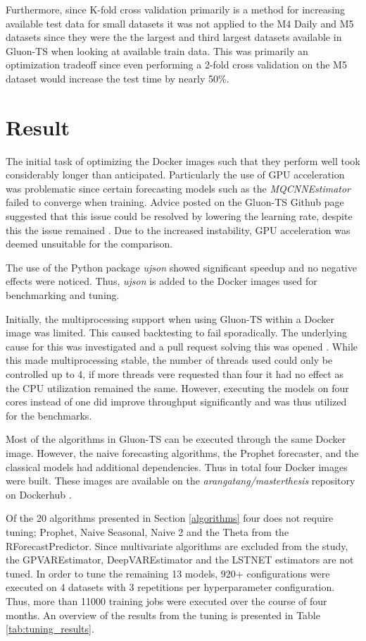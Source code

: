 Furthermore, since K-fold cross validation primarily is a method for increasing available test data for small datasets it was not applied to the M4 Daily and M5 datasets since they were the the largest and third largest datasets available in Gluon-TS when looking at available train data. This was primarily an optimization tradeoff since even performing a 2-fold cross validation on the M5 dataset would increase the test time by nearly 50\%.

\section{Result}
The initial task of optimizing the Docker images such that they perform well took considerably longer than anticipated. Particularly the use of GPU acceleration was problematic since certain forecasting models such as the \textit{MQCNNEstimator} failed to converge when training. Advice posted on the Gluon-TS Github page suggested that this issue could be resolved by lowering the learning rate, despite this the issue remained \cite{gluonts-github}. Due to the increased instability, GPU acceleration was deemed unsuitable for the comparison.

The use of the Python package \textit{ujson} showed significant speedup and no negative effects were noticed. Thus, \textit{ujson} is added to the Docker images used for benchmarking and tuning.

Initially, the multiprocessing support when using Gluon-TS within a Docker image was limited. This caused backtesting to fail sporadically. The underlying cause for this was investigated and a pull request solving this was opened \cite{fix_dockerfile_pr}. While this made multiprocessing stable, the number of threads used could only be controlled up to 4, if more threads vere requested than four it had no effect as the CPU utilization remained the same. However, executing the models on four cores instead of one did improve throughput significantly and was thus utilized for the benchmarks.

Most of the algorithms in Gluon-TS can be executed through the same Docker image. However, the naive forecasting algorithms, the Prophet forecaster, and the classical models had additional dependencies. Thus in total four Docker images were built. These images are available on the \textit{arangatang/masterthesis} repository on Dockerhub \cite{dockerhub_arangatang}.

Of the 20 algorithms presented in Section \ref{algorithms} four does not require tuning; Prophet, Naive Seasonal, Naive 2 and the Theta from the RForecastPredictor. Since multivariate algorithms are excluded from the study, the GPVAREstimator, DeepVAREstimator and the LSTNET estimators are not tuned. In order to tune the remaining 13 models, 920+ configurations were executed on 4 datasets with 3 repetitions per hyperparameter configuration. Thus, more than 11000 training jobs were executed over the course of four months. An overview of the results from the tuning is presented in Table \ref{tab:tuning_results}.

